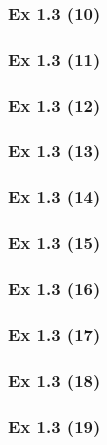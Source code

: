 \subsubsection{Ex 1.3 (10)}\label{sec:Ex_1.3.10}

\newpage		%

\subsubsection{Ex 1.3 (11)}\label{sec:Ex_1.3.11}

\subsubsection{Ex 1.3 (12)}\label{sec:Ex_1.3.12}

\subsubsection{Ex 1.3 (13)}\label{sec:Ex_1.3.13}

\subsubsection{Ex 1.3 (14)}\label{sec:Ex_1.3.14}

\subsubsection{Ex 1.3 (15)}\label{sec:Ex_1.3.15}

\subsubsection{Ex 1.3 (16)}\label{sec:Ex_1.3.16}

\subsubsection{Ex 1.3 (17)}\label{sec:Ex_1.3.17}

\subsubsection{Ex 1.3 (18)}\label{sec:Ex_1.3.18}

\subsubsection{Ex 1.3 (19)}\label{sec:Ex_1.3.19}

